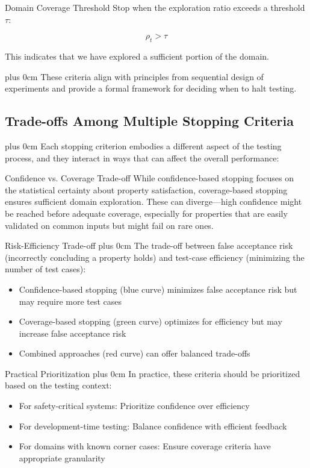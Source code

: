 \documentclass[conference]{IEEEtran}
\newcommand{\justifytext}{\leftskip=0pt \rightskip=0pt plus 0cm}
\begin{document}
\begin{definitionbox}{Domain Coverage Threshold}
Stop when the exploration ratio exceeds a threshold $\tau$:

\begin{equation}
\rho_t > \tau
\end{equation}

This indicates that we have explored a sufficient portion of the domain.
\end{definitionbox}

\justifytext
These criteria align with principles from sequential design of experiments \cite{chaloner1995} and provide a formal framework for deciding when to halt testing.

\subsection{Trade-offs Among Multiple Stopping Criteria}

\justifytext
Each stopping criterion embodies a different aspect of the testing process, and they interact in ways that can affect the overall performance:

\begin{theorembox}{Confidence vs. Coverage Trade-off}
While confidence-based stopping focuses on the statistical certainty about property satisfaction, coverage-based stopping ensures sufficient domain exploration. These can diverge—high confidence might be reached before adequate coverage, especially for properties that are easily validated on common inputs but might fail on rare ones.
\end{theorembox}

\begin{theorembox}{Risk-Efficiency Trade-off}
\justifytext
The trade-off between false acceptance risk (incorrectly concluding a property holds) and test-case efficiency (minimizing the number of test cases):
\begin{itemize}
\item Confidence-based stopping (blue curve) minimizes false acceptance risk but may require more test cases
\item Coverage-based stopping (green curve) optimizes for efficiency but may increase false acceptance risk
\item Combined approaches (red curve) can offer balanced trade-offs
\end{itemize}
\end{theorembox}

\begin{theorembox}{Practical Prioritization}
\justifytext
In practice, these criteria should be prioritized based on the testing context:
\begin{itemize}
\item For safety-critical systems: Prioritize confidence over efficiency
\item For development-time testing: Balance confidence with efficient feedback
\item For domains with known corner cases: Ensure coverage criteria have appropriate granularity
\end{itemize}
\end{theorembox}
\end{document}
